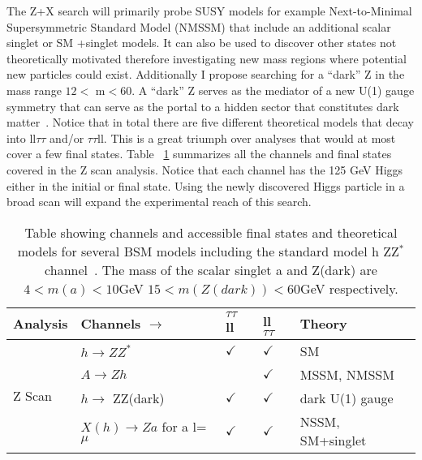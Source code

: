 The Z+X search will primarily probe SUSY models for example Next-to-Minimal Supersymmetric Standard Model (NMSSM) that include an additional scalar singlet or SM +singlet models.  It can also be used to discover other states not theoretically motivated therefore investigating new mass regions where potential new particles could exist.
Additionally I propose searching for a ``dark'' Z in the mass range $12<$ m$<60$. A ``dark'' Z serves as the mediator of a new U(1) gauge symmetry that can serve as the portal to a hidden sector that constitutes dark matter~\cite{zdark}. 
Notice that in total there are five different theoretical models that decay into ll$\tau\tau$ and/or $\tau\tau$ll.  This is a great triumph over analyses that would at most cover a few final states.
Table ~\ref{tab:anal} summarizes all the channels and final states covered in the Z scan analysis.  Notice that each channel has the 125 GeV Higgs either in the initial or final state. 
Using the newly discovered Higgs particle in a broad scan will expand the experimental reach of this search.


\begin{table}[h]
\begin{center}
\begin{tabular}{ l |  l    |  l                   | l         || l    }  \hline 
 Analysis   & Channels        $\rightarrow$  &  $\tau \tau$ ll  & ll $\tau \tau$  &   Theory  \\ \hline \hline
\multirow{4}{*}{Z Scan} & $h\rightarrow ZZ^*$ &  $\checkmark$ & $\checkmark$                     & SM \\  

  &$A \rightarrow Zh$            &                    & $\checkmark$     &   MSSM, NMSSM \\  
  &$h \rightarrow$ ZZ(dark)  &    $ \checkmark$          & $\checkmark$  &dark U(1) gauge     \\   
  &$X(h) \rightarrow  Za$ for a l=$\mu$  &  $\checkmark$      & $\checkmark$ &   NSSM, SM+singlet\\ \hline \hline

    \hline
    \end{tabular}
    \caption{ Table showing channels and accessible final states and theoretical models for several BSM models including the standard model h \too ZZ$^*$ channel~\cite{hexotic}.  The mass of the scalar singlet a and Z(dark) are  $4  <m(a)< 10 $GeV   $15 < m(Z(dark)) < 60 $GeV respectively.}
\label{tab:anal}
\end{center}
\end{table}

